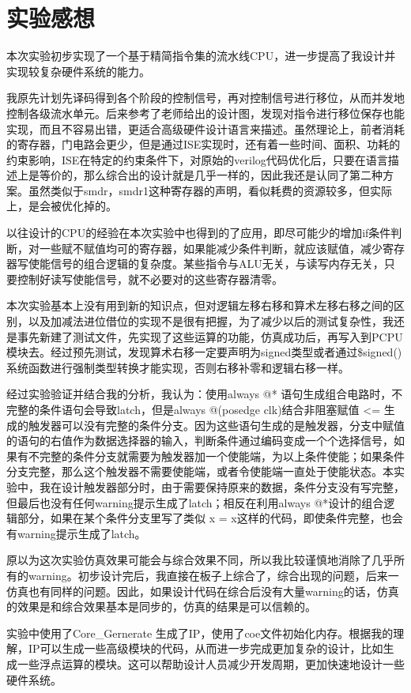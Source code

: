 \documentclass[10pt,a4paper,fleqn]{article}
\newcommand{\song}{\CJKfamily{song}}
\begin{document}
 \section{实验感想}
   \setlength{\parskip}{0.5\baselineskip}
   \par 本次实验初步实现了一个基于精简指令集的流水线CPU，进一步提高了我设计并实现较复杂硬件系统的能力。
   \par 我原先计划先译码得到各个阶段的控制信号，再对控制信号进行移位，从而并发地控制各级流水单元。后来参考了老师给出的设计图，发现对指令进行移位保存也能实现，而且不容易出错，更适合高级硬件设计语言来描述。虽然理论上，前者消耗的寄存器，门电路会更少，但是通过ISE实现时，还有着一些时间、面积、功耗的约束影响，ISE在特定的约束条件下，对原始的verilog代码优化后，只要在语言描述上是等价的，那么综合出的设计就是几乎一样的，因此我还是认同了第二种方案。虽然类似于smdr，smdr1这种寄存器的声明，看似耗费的资源较多，但实际上，是会被优化掉的。
   \par 以往设计的CPU的经验在本次实验中也得到的了应用，即尽可能少的增加if条件判断，对一些赋不赋值均可的寄存器，如果能减少条件判断，就应该赋值，减少寄存器写使能信号的组合逻辑的复杂度。某些指令与ALU无关，与读写内存无关，只要控制好读写使能信号，就不必要对的这些寄存器清零。
   \par 本次实验基本上没有用到新的知识点，但对逻辑左移右移和算术左移右移之间的区别，以及加减法进位借位的实现不是很有把握，为了减少以后的测试复杂性，我还是事先新建了测试文件，先实现了这些运算的功能，仿真成功后，再写入到PCPU模块去。经过预先测试，发现算术右移一定要声明为signed类型或者通过\$signed()系统函数进行强制类型转换才能实现，否则右移补零和逻辑右移一样。
   \par 经过实验验证并结合我的分析，我认为：使用always @* 语句生成组合电路时，不完整的条件语句会导致latch，但是always @(posedge clk)结合非阻塞赋值 <= 生成的触发器可以没有完整的条件分支。因为这些语句生成的是触发器，分支中赋值的语句的右值作为数据选择器的输入，判断条件通过编码变成一个个选择信号，如果有不完整的条件分支就需要为触发器加一个使能端，为以上条件使能；如果条件分支完整，那么这个触发器不需要使能端，或者令使能端一直处于使能状态。本实验中，我在设计触发器部分时，由于需要保持原来的数据，条件分支没有写完整，但最后也没有任何warning提示生成了latch；相反在利用always @*设计的组合逻辑部分，如果在某个条件分支里写了类似 x = x这样的代码，即使条件完整，也会有warning提示生成了latch。
   \par 原以为这次实验仿真效果可能会与综合效果不同，所以我比较谨慎地消除了几乎所有的warning。初步设计完后，我直接在板子上综合了，综合出现的问题，后来一仿真也有同样的问题。因此，如果设计代码在综合后没有大量warning的话，仿真的效果是和综合效果基本是同步的，仿真的结果是可以信赖的。
   \par 实验中使用了Core\_Gernerate 生成了IP，使用了coe文件初始化内存。根据我的理解，IP可以生成一些高级模块的代码，从而进一步完成更加复杂的设计，比如生成一些浮点运算的模块。这可以帮助设计人员减少开发周期，更加快速地设计一些硬件系统。
  \appendix
  \titleformat{\section}{\bf\song}{\thesection}{1em}{}
  \newpage
\end{document}
